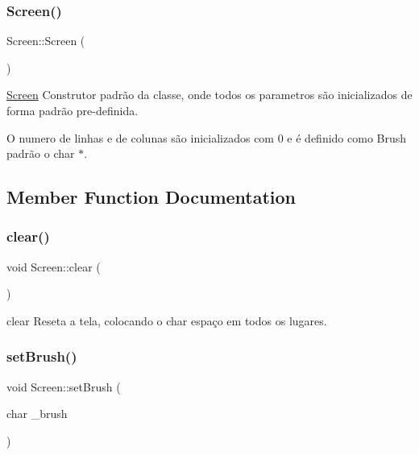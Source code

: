 \subsubsection{\texorpdfstring{Screen()}{Screen()}\hspace{0.1cm}{\footnotesize\ttfamily [2/2]}}
{\footnotesize\ttfamily Screen\+::\+Screen (\begin{DoxyParamCaption}{ }\end{DoxyParamCaption})}



\hyperlink{class_screen}{Screen} Construtor padrão da classe, onde todos os parametros são inicializados de forma padrão pre-\/definida. 

O numero de linhas e de colunas são inicializados com 0 e é definido como Brush padrão o char \textquotesingle{}$\ast$\textquotesingle{}. 

\subsection{Member Function Documentation}
\mbox{\label{class_screen_a35e74266b2a04e37b354ceff7a5f1031}} 
\subsubsection{\texorpdfstring{clear()}{clear()}}
{\footnotesize\ttfamily void Screen\+::clear (\begin{DoxyParamCaption}{ }\end{DoxyParamCaption})}



clear Reseta a tela, colocando o char espaço em todos os lugares. 

\mbox{\label{class_screen_aebc4eb6cb5acf15a0f04c1494622ab23}} 
\subsubsection{\texorpdfstring{set\+Brush()}{setBrush()}}
{\footnotesize\ttfamily void Screen\+::set\+Brush (\begin{DoxyParamCaption}\item[{char}]{\+\_\+brush }\end{DoxyParamCaption})}



